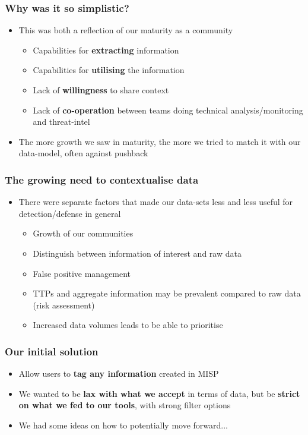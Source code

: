 \begin{frame}
  \frametitle{Why was it so simplistic?}
  \begin{itemize}
    \item This was both a reflection of our maturity as a community
    \begin{itemize}
      \item Capabilities for {\bf extracting} information
      \item Capabilities for {\bf utilising} the information
      \item Lack of {\bf willingness} to share context
      \item Lack of {\bf co-operation} between teams doing technical analysis/monitoring and threat-intel
    \end{itemize}
    \item The more growth we saw in maturity, the more we tried to match it with our data-model, often against pushback
  \end{itemize}
\end{frame}

\begin{frame}
\frametitle{The growing need to contextualise data}
\begin{itemize}
       \item There were separate factors that made our data-sets less and less useful for detection/defense in general
        \begin{itemize}
                \item Growth of our communities
                \item Distinguish between information of interest and raw data
                \item False positive management
                \item TTPs and aggregate information may be prevalent compared to raw data (risk assessment)
                \item Increased data volumes leads to be able to prioritise
        \end{itemize}
\end{itemize}
\end{frame}

\begin{frame}
\frametitle{Our initial solution}
\begin{itemize}
       \item Allow users to {\bf tag any information} created in MISP
       \item We wanted to be {\bf lax with what we accept} in terms of data, but be {\bf strict on what we fed to our tools}, with strong filter options
       \item We had some ideas on how to potentially move forward...
\end{itemize}
\end{frame}

